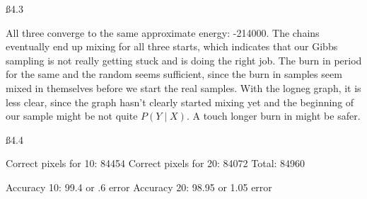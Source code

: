 \ss {4.3}

All three converge to the same approximate energy: -214000. The chains eventually end up mixing for all three starts, which indicates that our Gibbs sampling is not really getting stuck and is doing the right job. The burn in period for the same and the random seems sufficient, since the burn in samples seem mixed in themselves before we start the real samples. With the logneg graph, it is less clear, since the graph hasn't clearly started mixing yet and the beginning of our sample might be not quite $P(Y \mid X)$. A touch longer burn in might be safer.




\ss{4.4}

Correct pixels for 10: 84454
Correct pixels for 20: 84072
Total: 84960

Accuracy 10: 99.4 or .6 error
Accuracy 20: 98.95 or 1.05 error

